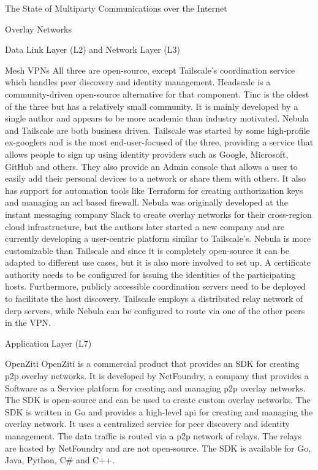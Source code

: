 \begin{frame}[fragile]{The State of Multiparty Communications over the
Internet}
\begin{block}{Overlay Networks}
\begin{block}{Data Link Layer (L2) and Network Layer (L3)}
\begin{block}{Mesh VPNs}
All three are open-source, except Tailscale's coordination service which
handles peer discovery and identity management. Headscale
\autocite{fontJuanfontHeadscale2022} is a community-driven open-source
alternative for that component. Tinc is the oldest of the three but has
a relatively small community. It is mainly developed by a single author
and appears to be more academic than industry motivated. Nebula and
Tailscale are both business driven. Tailscale was started by some
high-profile ex-googlers and is the most end-user-focused of the three,
providing a service that allows people to sign up using identity
providers such as Google, Microsoft, GitHub and others. They also
provide an Admin console that allows a user to easily add their personal
devices to a network or share them with others. It also has support for
automation tools like Terraform for creating authorization keys and
managing an \gls{acl} based firewall. Nebula was originally developed at
the instant messaging company Slack to create overlay networks for their
cross-region cloud infrastructure, but the authors later started a new
company and are currently developing a user-centric platform similar to
Tailscale's. Nebula is more customizable than Tailscale and since it is
completely open-source it can be adapted to different use cases, but it
is also more involved to set up. A certificate authority needs to be
configured for issuing the identities of the participating hosts.
Furthermore, publicly accessible coordination servers need to be
deployed to facilitate the host discovery. Tailscale employs a
distributed relay network of \gls{derp} servers, while Nebula can be
configured to route via one of the other peers in the VPN.
\end{block}
\end{block}

\begin{block}{Application Layer (L7)}
\protect\hypertarget{application-layer-l7}{}
\begin{block}{OpenZiti}
\protect\hypertarget{openziti}{}
OpenZiti is a commercial product that provides an SDK for creating
\gls{p2p} overlay networks. It is developed by NetFoundry, a company
that provides a Software as a Service platform for creating and managing
\gls{p2p} overlay networks. The SDK is open-source and can be used to
create custom overlay networks. The SDK is written in Go and provides a
high-level \gls{api} for creating and managing the overlay network. It
uses a centralized service for peer discovery and identity management.
The data traffic is routed via a \gls{p2p} network of relays. The relays
are hosted by NetFoundry and are not open-source. The SDK is available
for Go, Java, Python, C\# and C++.


\end{block}
\end{block}
\end{block}
\end{frame}
